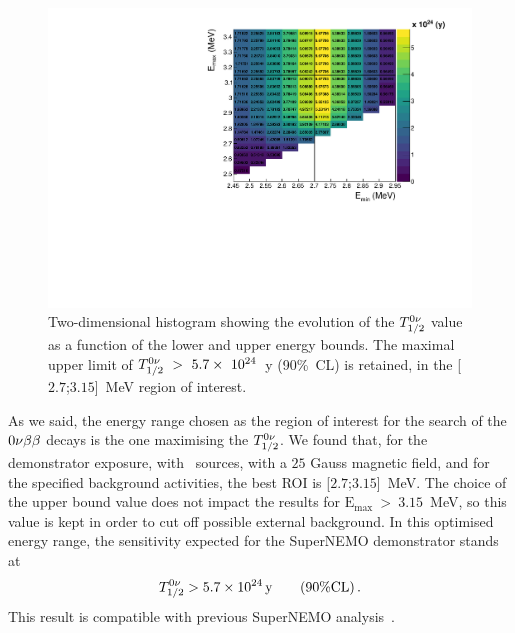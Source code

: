 \begin{figure}[h]
  \centering
  \includegraphics[width=1.1\textwidth]{Sensitivity/fig_sensitivity/sensitivity_spectrum_with_B_82Se.pdf}
  \caption{Two-dimensional histogram showing the evolution of the $T_{1/2}^{0\nu}$ value as a function of the lower and upper energy bounds.
    The maximal upper limit of $T_{1/2}^{0\nu}~>~5.7\times~10^{24}$~y (90\%~CL) is retained, in the [$2.7$;$3.15$]~MeV region of interest.
    \label{fig:sensitivity_cont}}
\end{figure}
As we said, the energy range chosen as the region of interest for the search of the $0\nu\beta\beta$ decays is the one maximising the $T_{1/2}^{0\nu}$.
We found that, for the demonstrator exposure, with \Se\ sources, with a $25$ Gauss magnetic field, and for the specified background activities, the best ROI is [$2.7$;$3.15$]~MeV.
The choice of the upper bound value does not impact the results for $\text{E}_{\text{max}}~>~3.15$~MeV, so this value is kept in order to cut off possible external background.
In this optimised energy range, the sensitivity expected for the SuperNEMO demonstrator stands at
\begin{equation}
T_{1/2}^{0\nu} > 5.7\times 10^{24}\,\text{y}\qquad (90\% \text{CL})\,.
\end{equation}
This result is compatible with previous SuperNEMO analysis~\cite{CalvezThesis}.


